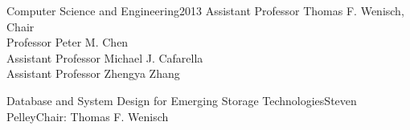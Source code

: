\documentclass[reqno,12pt,oneside]{report} %
\theoremstyle{plain}
\theoremstyle{definition}
\theoremstyle{remark}
\numberwithin{theorem}{chapter}     %
\begin{document}

{Computer Science and Engineering}{2013}
{Assistant Professor Thomas F. Wenisch, Chair\\
 Professor Peter M. Chen\\
 Assistant Professor Michael J. Cafarella\\
 Assistant Professor Zhengya Zhang}

\initializefrontsections



\makeatletter
\if@twoside \setcounter{page}{4} \else \setcounter{page}{0} \fi
\makeatother
 

%

%

\tableofcontents     %
\listoffigures       %
\listoftables        %
\listofappendices    %
\listofabbreviations %

\startabstractpage
{Database and System Design for Emerging Storage Technologies}{Steven Pelley}{Chair: Thomas F. Wenisch}

\label{Abstract}

\startthechapters 
\end{document}
